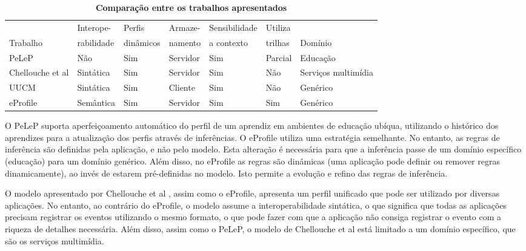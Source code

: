 \documentclass[times, 10pt, twocolumn]{article}
\begin{document}
\begin{table}\centering\footnotesize
  \begin{tabular*}{0.7\textwidth}{@{}lllllll@{}}
    \toprule
                                         & Interope-  & Perfis    & Armaze-  & Sensibilidade & Utiliza & \\
    Trabalho                             & rabilidade & dinâmicos & namento  & a contexto    & trilhas & Domínio \\
    \midrule
    PeLeP                                & Não        & Sim       & Servidor & Sim           & Parcial & Educação \\
    Chellouche et al                     & Sintática  & Sim       & Servidor & Sim           & Não     & Serviços multimídia \\
    UUCM                                 & Sintática  & Sim       & Cliente  & Sim           & Não     & Genérico \\
    eProfile                             & Semântica  & Sim       & Servidor & Sim           & Sim     & Genérico \\
    \bottomrule
  \end{tabular*}
  \caption{\textbf{Comparação entre os trabalhos apresentados}}
  \label{tab:comparacao2}
\end{table}


O PeLeP \cite{pelep} suporta aperfeiçoamento automático do perfil de um aprendiz em ambientes de educação ubíqua, utilizando o histórico dos aprendizes para a atualização dos perfis através de inferências. O eProfile utiliza uma estratégia semelhante. No entanto, as regras de inferência são definidas pela aplicação, e não pelo modelo. Esta alteração é necessária para que a inferência passe de um domínio específico (educação) para um domínio genérico. Além disso, no eProfile as regras são dinâmicas (uma aplicação pode definir ou remover regras dinamicamente), ao invés de estarem pré-definidas no modelo. Isto permite a evolução e refino das regras de inferência.

O modelo apresentado por Chellouche et al \cite{chellouche10}, assim como o eProfile, apresenta um perfil unificado que pode ser utilizado por diversas aplicações. No entanto, ao contrário do eProfile, o modelo assume a interoperabilidade sintática, o que significa que todas as aplicações precisam registrar os eventos utilizando o mesmo formato, o que pode fazer com que a aplicação não consiga registrar o evento com a riqueza de detalhes necessária. Além disso, assim como o PeLeP, o modelo de Chellouche et al \cite{chellouche10} está limitado a um domínio específico, que são os serviços multimídia.
\end{document}
